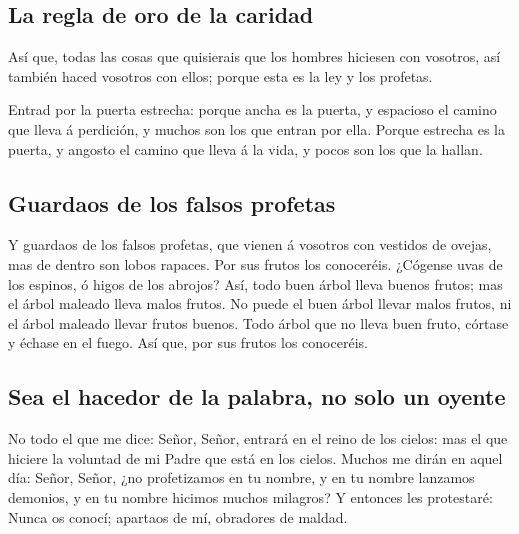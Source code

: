 \hypertarget{la-regla-de-oro-de-la-caridad}{%
\subsection{La regla de oro de la
caridad}\label{la-regla-de-oro-de-la-caridad}}

 Así que, todas las cosas que quisierais que los hombres
hiciesen con vosotros, así también haced vosotros con ellos; porque esta
es la ley y los profetas.

 Entrad por la puerta estrecha: porque ancha es la
puerta, y espacioso el camino que lleva á perdición, y muchos son los
que entran por ella.  Porque estrecha es la puerta, y
angosto el camino que lleva á la vida, y pocos son los que la hallan.

\hypertarget{guardaos-de-los-falsos-profetas}{%
\subsection{Guardaos de los falsos
profetas}\label{guardaos-de-los-falsos-profetas}}

 Y guardaos de los falsos profetas, que vienen á vosotros
con vestidos de ovejas, mas de dentro son lobos rapaces. 
Por sus frutos los conoceréis. ¿Cógense uvas de los espinos, ó higos de
los abrojos?  Así, todo buen árbol lleva buenos frutos;
mas el árbol maleado lleva malos frutos.  No puede el
buen árbol llevar malos frutos, ni el árbol maleado llevar frutos
buenos.  Todo árbol que no lleva buen fruto, córtase y
échase en el fuego.  Así que, por sus frutos los
conoceréis.

\hypertarget{sea-el-hacedor-de-la-palabra-no-solo-un-oyente}{%
\subsection{Sea el hacedor de la palabra, no solo un
oyente}\label{sea-el-hacedor-de-la-palabra-no-solo-un-oyente}}

 No todo el que me dice: Señor, Señor, entrará en el
reino de los cielos: mas el que hiciere la voluntad de mi Padre que está
en los cielos.  Muchos me dirán en aquel día: Señor,
Señor, ¿no profetizamos en tu nombre, y en tu nombre lanzamos demonios,
y en tu nombre hicimos muchos milagros?  Y entonces les
protestaré: Nunca os conocí; apartaos de mí, obradores de maldad.

